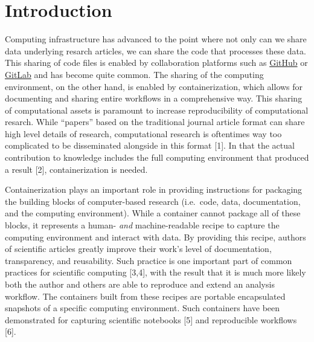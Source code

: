 \documentclass[10pt,letterpaper]{article}
\begin{document}

\linenumbers

\hypertarget{introduction}{%
\section*{Introduction}\label{introduction}}

Computing infrastructure has advanced to the point where not only can we
share data underlying resarch articles, we can share the code that
processes these data. This sharing of code files is enabled by
collaboration platforms such as \href{https://github.com}{GitHub} or
\href{https://gitlab.com}{GitLab} and has become quite common. The
sharing of the computing environment, on the other hand, is enabled by
containerization, which allows for documenting and sharing entire
workflows in a comprehensive way. This sharing of computational assets
is paramount to increase reproducibility of computational resarch. While
``papers'' based on the traditional journal article format can share
high level details of research, computational research is oftentimes way
too complicated to be disseminated alongside in this format {[}1{]}. In
that the actual contribution to knowledge includes the full computing
environment that produced a result {[}2{]}, containerization is needed.

Containerization plays an important role in providing instructions for
packaging the building blocks of computer-based research (i.e.~code,
data, documentation, and the computing environment). While a container
cannot package all of these blocks, it represents a human- \emph{and}
machine-readable recipe to capture the computing environment and
interact with data. By providing this recipe, authors of scientific
articles greatly improve their work's level of documentation,
transparency, and reusability. Such practice is one important part of
common practices for scientific computing {[}3,4{]}, with the result
that it is much more likely both the author and others are able to
reproduce and extend an analysis workflow. The containers built from
these recipes are portable encapsulated snapshots of a specific
computing environment. Such containers have been demonstrated for
capturing scientific notebooks {[}5{]} and reproducible workflows
{[}6{]}.
\end{document}
